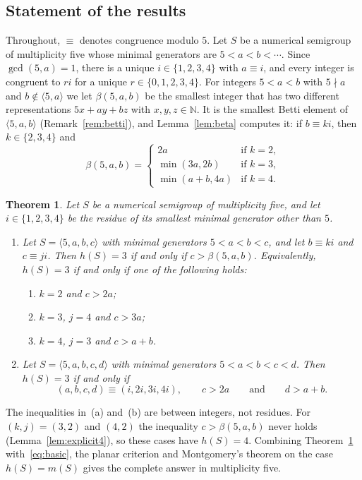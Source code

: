 \documentclass{amsart}
\newtheorem{theorem}{Theorem}[section]
\theoremstyle{definition}
\theoremstyle{remark}
\numberwithin{equation}{section}
\newcommand{\N}{\mathbb{N}}
\newcommand{\gen}[1]{\langle #1\rangle}
\begin{document}
\subsection*{Statement of the results}
Throughout, $\equiv$ denotes congruence modulo $5$. Let $S$ be a numerical semigroup of multiplicity five whose minimal generators are $5<a<b<\cdots$. Since $\gcd(5,a)=1$, there is a unique $i\in\{1,2,3,4\}$ with $a\equiv i$, and every integer is congruent to $ri$ for a unique $r\in\{0,1,2,3,4\}$. For integers $5<a<b$ with $5\nmid a$ and $b\notin\gen{5,a}$ we let $\beta(5,a,b)$ be the smallest integer that has two different representations $5x+ay+bz$ with $x,y,z\in\N$. It is the smallest Betti element of $\gen{5,a,b}$ (Remark~\ref{rem:betti}), and Lemma~\ref{lem:beta} computes it: if $b\equiv ki$, then $k\in\{2,3,4\}$ and
\begin{equation}\label{eq:beta}
\beta(5,a,b)=
\begin{cases}
2a & \text{if } k=2,\\
\min(3a,2b) & \text{if } k=3,\\
\min(a+b,4a) & \text{if } k=4.
\end{cases}
\end{equation}

\begin{theorem}\label{thm:main}
Let $S$ be a numerical semigroup of multiplicity five, and let $i\in\{1,2,3,4\}$ be the residue of its smallest minimal generator other than $5$.
\begin{enumerate}
\item[(a)] Let $S=\gen{5,a,b,c}$ with minimal generators $5<a<b<c$, and let $b\equiv ki$ and $c\equiv ji$. Then $h(S)=3$ if and only if $c>\beta(5,a,b)$. Equivalently, $h(S)=3$ if and only if one of the following holds:
\begin{enumerate}
\item[(i)] $k=2$ and $c>2a$;
\item[(ii)] $k=3$, $j=4$ and $c>3a$;
\item[(iii)] $k=4$, $j=3$ and $c>a+b$.
\end{enumerate}
\item[(b)] Let $S=\gen{5,a,b,c,d}$ with minimal generators $5<a<b<c<d$. Then $h(S)=3$ if and only if
\[
(a,b,c,d)\equiv(i,2i,3i,4i),\qquad c>2a\qquad\text{and}\qquad d>a+b.
\]
\end{enumerate}
\end{theorem}

The inequalities in~(a) and~(b) are between integers, not residues. For $(k,j)=(3,2)$ and $(4,2)$ the inequality $c>\beta(5,a,b)$ never holds (Lemma~\ref{lem:explicit4}), so these cases have $h(S)=4$. Combining Theorem~\ref{thm:main} with~\eqref{eq:basic}, the planar criterion and Montgomery's theorem on the case $h(S)=m(S)$ gives the complete answer in multiplicity five.
\end{document}
